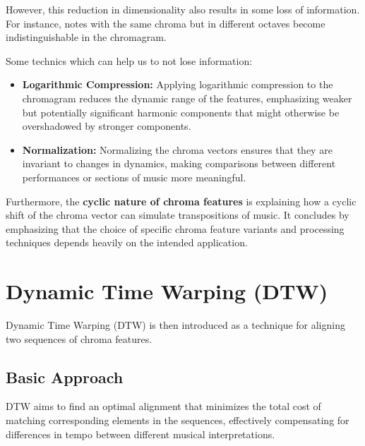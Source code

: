 \documentclass[a4paper, 9pt, twocolumn]{extarticle}
\begin{document}

However, this reduction in dimensionality also results in some loss of
information. For instance, notes with the same chroma but in different
octaves become indistinguishable in the chromagram.

Some technics which can help us to not lose information:

\begin{itemize}
  \item
        \textbf{Logarithmic Compression:} Applying logarithmic compression to
        the chromagram reduces the dynamic range of the features, emphasizing
        weaker but potentially significant harmonic components that might
        otherwise be overshadowed by stronger components.
  \item
        \textbf{Normalization:} Normalizing the chroma vectors ensures that
        they are invariant to changes in dynamics, making comparisons between
        different performances or sections of music more meaningful.
\end{itemize}

Furthermore, the \textbf{cyclic nature of chroma features} is explaining
how a cyclic shift of the chroma vector can simulate transpositions of
music. It concludes by emphasizing that the choice of specific chroma
feature variants and processing techniques depends heavily on the
intended application.

\section{Dynamic Time Warping (DTW)}
Dynamic Time Warping (DTW) is then introduced as a technique
for aligning two sequences of chroma features.

\subsection{ Basic Approach}
DTW aims to find an optimal alignment that minimizes the total cost of matching
corresponding elements in the sequences, effectively compensating for
differences in tempo between different musical interpretations.
\end{document}
